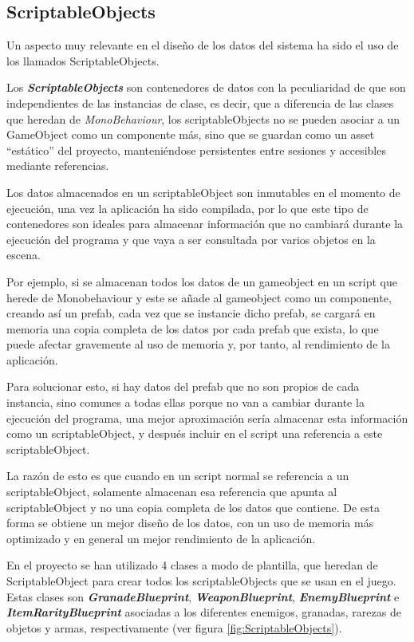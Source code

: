 \subsection{ScriptableObjects}
Un aspecto muy relevante en el diseño de los datos del sistema ha sido el uso de los llamados ScriptableObjects. 

Los \textbf{\textit{ScriptableObjects}} son contenedores de datos con la peculiaridad de que son independientes de las instancias de clase, es decir, que a diferencia de las clases que heredan de \textit{MonoBehaviour}, los scriptableObjects no se pueden asociar a un GameObject como un componente más, sino que se guardan como un asset “estático” del proyecto, manteniéndose persistentes entre sesiones y accesibles mediante referencias.

Los datos almacenados en un scriptableObject son inmutables en el momento de ejecución, una vez la aplicación ha sido compilada, por lo que este tipo de contenedores son ideales para almacenar información que no cambiará durante la ejecución del programa y que vaya a ser consultada por varios objetos en la escena.

Por ejemplo, si se almacenan todos los datos de un gameobject en un script que herede de Monobehaviour y este se añade al gameobject como un componente, creando así un prefab, cada vez que se instancie dicho prefab, se cargará en memoria una copia completa de los datos por cada prefab que exista, lo que puede afectar gravemente al uso de memoria y, por tanto, al rendimiento de la aplicación.

Para solucionar esto, si hay datos del prefab que no son propios de cada instancia, sino comunes a todas ellas porque no van a cambiar durante la ejecución del programa, una mejor aproximación sería almacenar esta información como un scriptableObject, y después incluir en el script una referencia a este scriptableObject.

La razón de esto es que cuando en un script normal se referencia a un scriptableObject, solamente almacenan esa referencia que apunta al scriptableObject y no una copia completa de los datos que contiene. De esta forma se obtiene un mejor diseño de los datos, con un uso de memoria más optimizado y en general un mejor rendimiento de la aplicación.

En el proyecto se han utilizado 4 clases a modo de plantilla, que heredan de ScriptableObject para crear todos los scriptableObjects que se usan en el juego. Estas clases son \textbf{\textit{GranadeBlueprint}}, \textbf{\textit{WeaponBlueprint}}, \textbf{\textit{EnemyBlueprint}} e \textbf{\textit{ItemRarityBlueprint}} asociadas a los diferentes enemigos, granadas, rarezas de objetos y armas, respectivamente (ver figura \ref{fig:ScriptableObjects}).

